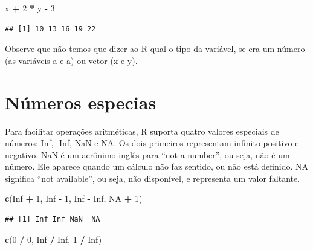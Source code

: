 \documentclass[
]{book}
\newenvironment{Shaded}{\begin{snugshade}}{\end{snugshade}}
\newcommand{\ConstantTok}[1]{\textcolor[rgb]{0.56,0.35,0.01}{#1}}
\newcommand{\DecValTok}[1]{\textcolor[rgb]{0.00,0.00,0.81}{#1}}
\newcommand{\FunctionTok}[1]{\textcolor[rgb]{0.13,0.29,0.53}{\textbf{#1}}}
\newcommand{\NormalTok}[1]{#1}
\newcommand{\SpecialCharTok}[1]{\textcolor[rgb]{0.81,0.36,0.00}{\textbf{#1}}}
\begin{document}
\begin{Shaded}
\begin{Highlighting}[]
\NormalTok{x }\SpecialCharTok{+} \DecValTok{2} \SpecialCharTok{*}\NormalTok{ y }\SpecialCharTok{{-}} \DecValTok{3}
\end{Highlighting}
\end{Shaded}

\begin{verbatim}
## [1] 10 13 16 19 22
\end{verbatim}

Observe que não temos que dizer ao R qual o tipo da variável, se era um número (as variáveis a e a) ou vetor (x e y).

\section{Números especias}\label{nuxfameros-especias}

Para facilitar operações aritméticas, R suporta quatro valores especiais de números: Inf, -Inf, NaN e NA.
Os dois primeiros representam infinito positivo e negativo.
NaN é um acrônimo inglês para ``not a number'', ou seja, não é um número.
Ele aparece quando um cálculo não faz sentido, ou não está definido.
NA significa ``not available'', ou seja, não disponível, e representa um valor faltante.

\begin{Shaded}
\begin{Highlighting}[]
\FunctionTok{c}\NormalTok{(}\ConstantTok{Inf} \SpecialCharTok{+} \DecValTok{1}\NormalTok{, }\ConstantTok{Inf} \SpecialCharTok{{-}} \DecValTok{1}\NormalTok{, }\ConstantTok{Inf} \SpecialCharTok{{-}} \ConstantTok{Inf}\NormalTok{, }\ConstantTok{NA} \SpecialCharTok{+} \DecValTok{1}\NormalTok{)}
\end{Highlighting}
\end{Shaded}

\begin{verbatim}
## [1] Inf Inf NaN  NA
\end{verbatim}

\begin{Shaded}
\begin{Highlighting}[]
\FunctionTok{c}\NormalTok{(}\DecValTok{0} \SpecialCharTok{/} \DecValTok{0}\NormalTok{, }\ConstantTok{Inf} \SpecialCharTok{/} \ConstantTok{Inf}\NormalTok{, }\DecValTok{1} \SpecialCharTok{/} \ConstantTok{Inf}\NormalTok{)}
\end{Highlighting}
\end{Shaded}
\end{document}
